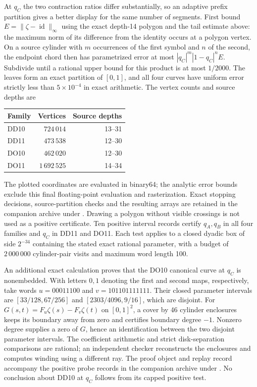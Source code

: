 At $q_C$ the two contraction ratios differ substantially, so an
adaptive prefix partition gives a better display for the same
number of segments. First bound
$E=\|\zeta-\operatorname{id}\|_\infty$ using the exact depth-14
polygon and the tail estimate above: the maximum norm of its
difference from the identity occurs at a polygon vertex. On a
source cylinder with $m$ occurrences of the first symbol and $n$
of the second,
the endpoint chord then has parametrized error at most
$|q_C|^m|1-q_C|^n E$. Subdivide until a rational upper bound for
this product is at most $1/2000$. The leaves form an exact
partition of $[0,1]$, and all four curves have uniform error
strictly less than $5\times10^{-4}$ in exact arithmetic.
The vertex counts and source depths are
\begin{center}
\begin{tabular}{lrr}
Family&Vertices&Source depths\\\hline
DD10&$724\,014$&13--31\\
DD11&$473\,538$&12--30\\
DO10&$462\,020$&12--30\\
DO11&$1\,692\,525$&14--34
\end{tabular}
\end{center}
The plotted coordinates are evaluated in binary64; the analytic
error bounds exclude this final floating-point evaluation and
rasterization. Exact stopping decisions, source-partition checks
and the resulting arrays are retained in the companion archive under
.
Drawing a polygon without visible crossings is not used as a
positive certificate. Ten
positive interval records certify $q_A,q_B$ in all four families
and $q_C$ in DD11 and DO11. Each test applies to a closed dyadic
box of side $2^{-34}$ containing the stated exact rational
parameter, with a budget of $2\,000\,000$ cylinder-pair visits
and maximum word length 100.

An additional exact calculation proves that the DO10 canonical
curve at $q_C$ is nonembedded. With letters $0,1$ denoting the
first and second maps, respectively, take words
$u=00011100$ and $v=101101111111$. Their closed parameter intervals
are $[33/128,67/256]$ and $[2303/4096,9/16]$, which are disjoint.
For $G(s,t)=F_u\zeta(s)-F_v\zeta(t)$ on $[0,1]^2$, a cover by
46 cylinder enclosures keeps its boundary away from zero and
certifies boundary degree $-1$. Nonzero degree supplies a zero
of $G$, hence an identification between the two disjoint
parameter intervals. The coefficient arithmetic and strict
disk-separation comparisons are rational; an independent checker
reconstructs the enclosures and computes winding using a
different ray. The proof object and replay record accompany the positive probe records in the companion archive under
. No conclusion
about DD10 at $q_C$ follows from its capped positive test.

